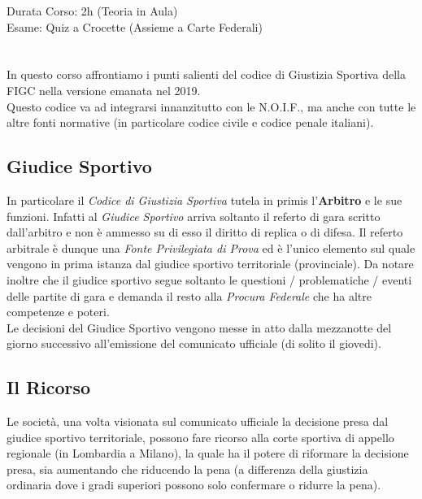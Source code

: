 \documentclass[../uefaC.tex]{subfiles}
\begin{document}

Durata Corso: 2h (Teoria in Aula) \hfill \\
Esame: Quiz a Crocette (Assieme a Carte Federali)
\hfill \\
\hfill \\
\hfill \\
In questo corso affrontiamo i punti salienti del codice di Giustizia Sportiva della FIGC nella versione emanata nel 2019. \hfill \\
Questo codice va ad integrarsi innanzitutto con le N.O.I.F., ma anche con tutte le altre fonti normative (in particolare codice civile e codice penale italiani).
\hfill \\

\subsection{Giudice Sportivo}
In particolare il \emph{Codice di Giustizia Sportiva} tutela in primis l'\textbf{Arbitro} e le sue funzioni. Infatti al \emph{Giudice Sportivo} arriva soltanto il referto di gara scritto dall'arbitro e non è ammesso su di esso il diritto di replica o di difesa. Il referto arbitrale è dunque una \emph{Fonte Privilegiata di Prova} ed è l'unico elemento sul quale vengono in prima istanza dal giudice sportivo territoriale (provinciale). Da notare inoltre che il giudice sportivo segue soltanto le questioni / problematiche / eventi delle partite di gara e demanda il resto alla \emph{Procura Federale} che ha altre competenze e poteri. \hfill \\
Le decisioni del Giudice Sportivo vengono messe in atto dalla mezzanotte del giorno successivo all'emissione del comunicato ufficiale (di solito il giovedi).

\subsection{Il Ricorso}
Le società, una volta visionata sul comunicato ufficiale la decisione presa dal giudice sportivo territoriale, possono fare ricorso alla corte sportiva di appello regionale (in Lombardia a Milano), la quale ha il potere di riformare la decisione presa, sia aumentando che riducendo la pena (a differenza della giustizia ordinaria dove i gradi superiori possono solo confermare o ridurre la pena).
\end{document}
